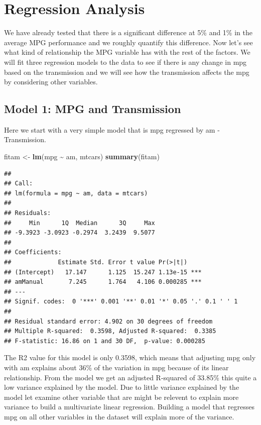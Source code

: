 \documentclass[]{article}
\newenvironment{Shaded}{\begin{snugshade}}{\end{snugshade}}
\newcommand{\KeywordTok}[1]{\textcolor[rgb]{0.13,0.29,0.53}{\textbf{#1}}}
\newcommand{\NormalTok}[1]{#1}
\newcommand{\OperatorTok}[1]{\textcolor[rgb]{0.81,0.36,0.00}{\textbf{#1}}}
\newcommand{\StringTok}[1]{\textcolor[rgb]{0.31,0.60,0.02}{#1}}
\begin{document}
\hypertarget{regression-analysis}{%
\section{Regression Analysis}\label{regression-analysis}}

We have already tested that there is a significant difference at 5\% and
1\% in the average MPG performance and we roughly quantify this
difference. Now let's see what kind of relationship the MPG variable has
with the rest of the factors. We will fit three regression models to the
data to see if there is any change in mpg based on the transmission and
we will see how the transmission affects the mpg by considering other
variables.

\hypertarget{model-1-mpg-and-transmission}{%
\subsection{Model 1: MPG and
Transmission}\label{model-1-mpg-and-transmission}}

Here we start with a very simple model that is mpg regressed by am -
Transmission.

\begin{Shaded}
\begin{Highlighting}[]
\NormalTok{fitam \textless{}{-}}\StringTok{ }\KeywordTok{lm}\NormalTok{(mpg }\OperatorTok{\textasciitilde{}}\StringTok{ }\NormalTok{am, mtcars)}
\KeywordTok{summary}\NormalTok{(fitam)}
\end{Highlighting}
\end{Shaded}

\begin{verbatim}
## 
## Call:
## lm(formula = mpg ~ am, data = mtcars)
## 
## Residuals:
##     Min      1Q  Median      3Q     Max 
## -9.3923 -3.0923 -0.2974  3.2439  9.5077 
## 
## Coefficients:
##             Estimate Std. Error t value Pr(>|t|)    
## (Intercept)   17.147      1.125  15.247 1.13e-15 ***
## amManual       7.245      1.764   4.106 0.000285 ***
## ---
## Signif. codes:  0 '***' 0.001 '**' 0.01 '*' 0.05 '.' 0.1 ' ' 1
## 
## Residual standard error: 4.902 on 30 degrees of freedom
## Multiple R-squared:  0.3598, Adjusted R-squared:  0.3385 
## F-statistic: 16.86 on 1 and 30 DF,  p-value: 0.000285
\end{verbatim}

The R2 value for this model is only 0.3598, which means that adjusting
mpg only with am explains about 36\% of the variation in mpg because of
its linear relationship. From the model we get an adjusted R-squared of
33.85\% this quite a low variance explained by the model. Due to little
variance explained by the model let examine other variable that are
might be relevent to explain more variance to build a multivariate
linear regression. Building a model that regresses mpg on all other
variables in the dataset will explain more of the variance.
\end{document}
